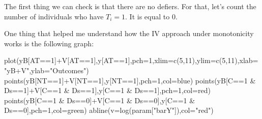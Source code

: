 \documentclass[
]{book}
\newenvironment{Shaded}{\begin{snugshade}}{\end{snugshade}}
\newcommand{\AttributeTok}[1]{\textcolor[rgb]{0.77,0.63,0.00}{#1}}
\newcommand{\DecValTok}[1]{\textcolor[rgb]{0.00,0.00,0.81}{#1}}
\newcommand{\FunctionTok}[1]{\textcolor[rgb]{0.00,0.00,0.00}{#1}}
\newcommand{\NormalTok}[1]{#1}
\newcommand{\SpecialCharTok}[1]{\textcolor[rgb]{0.00,0.00,0.00}{#1}}
\newcommand{\StringTok}[1]{\textcolor[rgb]{0.31,0.60,0.02}{#1}}
\theoremstyle{definition}
\theoremstyle{definition}
\theoremstyle{definition}
\theoremstyle{definition}
\theoremstyle{remark}
\begin{document}
The first thing we can check is that there are no defiers.
For that, let's count the number of individuals who have \(T_i=1\).
It is equal to 0.

One thing that helped me understand how the IV approach under monotonicity works is the following graph:

\begin{Shaded}
\begin{Highlighting}[]
\FunctionTok{plot}\NormalTok{(yB[AT}\SpecialCharTok{==}\DecValTok{1}\NormalTok{]}\SpecialCharTok{+}\NormalTok{V[AT}\SpecialCharTok{==}\DecValTok{1}\NormalTok{],y[AT}\SpecialCharTok{==}\DecValTok{1}\NormalTok{],}\AttributeTok{pch=}\DecValTok{1}\NormalTok{,}\AttributeTok{xlim=}\FunctionTok{c}\NormalTok{(}\DecValTok{5}\NormalTok{,}\DecValTok{11}\NormalTok{),}\AttributeTok{ylim=}\FunctionTok{c}\NormalTok{(}\DecValTok{5}\NormalTok{,}\DecValTok{11}\NormalTok{),}\AttributeTok{xlab=}\StringTok{"yB+V"}\NormalTok{,}\AttributeTok{ylab=}\StringTok{"Outcomes"}\NormalTok{)}
\FunctionTok{points}\NormalTok{(yB[NT}\SpecialCharTok{==}\DecValTok{1}\NormalTok{]}\SpecialCharTok{+}\NormalTok{V[NT}\SpecialCharTok{==}\DecValTok{1}\NormalTok{],y[NT}\SpecialCharTok{==}\DecValTok{1}\NormalTok{],}\AttributeTok{pch=}\DecValTok{1}\NormalTok{,}\AttributeTok{col=}\StringTok{\textquotesingle{}blue\textquotesingle{}}\NormalTok{)}
\FunctionTok{points}\NormalTok{(yB[C}\SpecialCharTok{==}\DecValTok{1} \SpecialCharTok{\&}\NormalTok{ Ds}\SpecialCharTok{==}\DecValTok{1}\NormalTok{]}\SpecialCharTok{+}\NormalTok{V[C}\SpecialCharTok{==}\DecValTok{1} \SpecialCharTok{\&}\NormalTok{ Ds}\SpecialCharTok{==}\DecValTok{1}\NormalTok{],y[C}\SpecialCharTok{==}\DecValTok{1} \SpecialCharTok{\&}\NormalTok{ Ds}\SpecialCharTok{==}\DecValTok{1}\NormalTok{],}\AttributeTok{pch=}\DecValTok{1}\NormalTok{,}\AttributeTok{col=}\StringTok{\textquotesingle{}red\textquotesingle{}}\NormalTok{)}
\FunctionTok{points}\NormalTok{(yB[C}\SpecialCharTok{==}\DecValTok{1} \SpecialCharTok{\&}\NormalTok{ Ds}\SpecialCharTok{==}\DecValTok{0}\NormalTok{]}\SpecialCharTok{+}\NormalTok{V[C}\SpecialCharTok{==}\DecValTok{1} \SpecialCharTok{\&}\NormalTok{ Ds}\SpecialCharTok{==}\DecValTok{0}\NormalTok{],y[C}\SpecialCharTok{==}\DecValTok{1} \SpecialCharTok{\&}\NormalTok{ Ds}\SpecialCharTok{==}\DecValTok{0}\NormalTok{],}\AttributeTok{pch=}\DecValTok{1}\NormalTok{,}\AttributeTok{col=}\StringTok{\textquotesingle{}green\textquotesingle{}}\NormalTok{)}
\FunctionTok{abline}\NormalTok{(}\AttributeTok{v=}\FunctionTok{log}\NormalTok{(param[}\StringTok{"barY"}\NormalTok{]),}\AttributeTok{col=}\StringTok{"red"}\NormalTok{)}

\end{Highlighting}
\end{Shaded}
\end{document}
